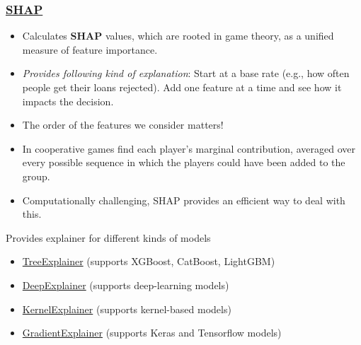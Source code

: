 \documentclass[]{article}
\providecommand{\tightlist}{%
  \setlength{\itemsep}{0pt}\setlength{\parskip}{0pt}}
\begin{document}
\hypertarget{shap}{%
\subsubsection{\texorpdfstring{\href{https://github.com/vermashivam679/shap}{SHAP}}{SHAP}}\label{shap}}

\begin{itemize}
\tightlist
\item
  Calculates \textbf{SHAP} values, which are rooted in game theory, as a
  unified measure of feature importance.
\item
  \emph{Provides following kind of explanation}: Start at a base rate
  (e.g., how often people get their loans rejected). Add one feature at
  a time and see how it impacts the decision.
\item
  The order of the features we consider matters!
\item
  In cooperative games find each player's marginal contribution,
  averaged over every possible sequence in which the players could have
  been added to the group.
\item
  Computationally challenging, SHAP provides an efficient way to deal
  with this.
\end{itemize}

Provides explainer for different kinds of models

\begin{itemize}
\tightlist
\item
  \href{https://shap.readthedocs.io/en/latest/}{TreeExplainer} (supports
  XGBoost, CatBoost, LightGBM)
\item
  \href{https://shap.readthedocs.io/en/latest/index.html\#shap.DeepExplainer}{DeepExplainer}
  (supports deep-learning models)
\item
  \href{https://shap.readthedocs.io/en/latest/index.html\#shap.KernelExplainer}{KernelExplainer}
  (supports kernel-based models)
\item
  \href{https://shap.readthedocs.io/en/latest/index.html\#shap.GradientExplainer}{GradientExplainer}
  (supports Keras and Tensorflow models)
\end{itemize}
\end{document}
